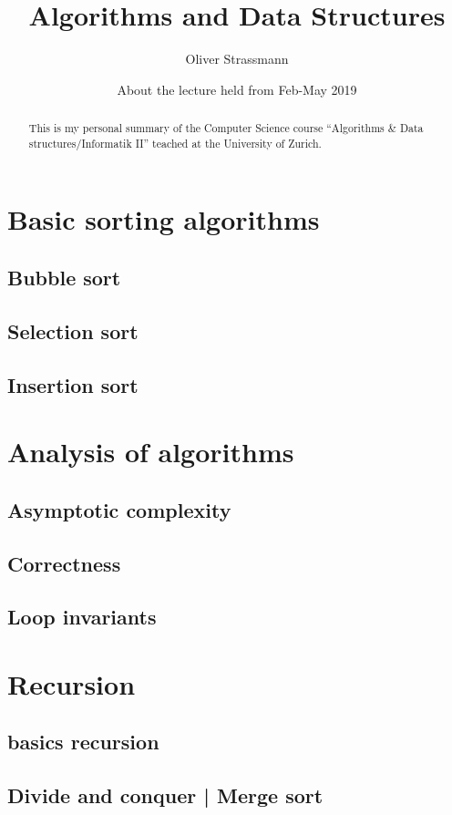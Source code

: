 \documentclass{article}
\title{Algorithms and Data Structures}
\author{Oliver Strassmann}
\date{About the lecture held from Feb-May 2019}
\begin{document}
\maketitle

\newpage

\begin{abstract} 
This is my personal summary of the Computer Science course ``Algorithms \& Data structures/Informatik II'' teached at the University of Zurich.
\end{abstract}
 
\tableofcontents

\section{Basic sorting algorithms} 
	\subsection{Bubble sort} 
	\subsection{Selection sort}
	\subsection{Insertion sort}

\section{Analysis of algorithms}
	\subsection{Asymptotic complexity}
	\subsection{Correctness}
	\subsection{Loop invariants}
	
\section{Recursion}
	\subsection{basics recursion}
	\subsection{Divide and conquer | Merge sort }
\end{document}
